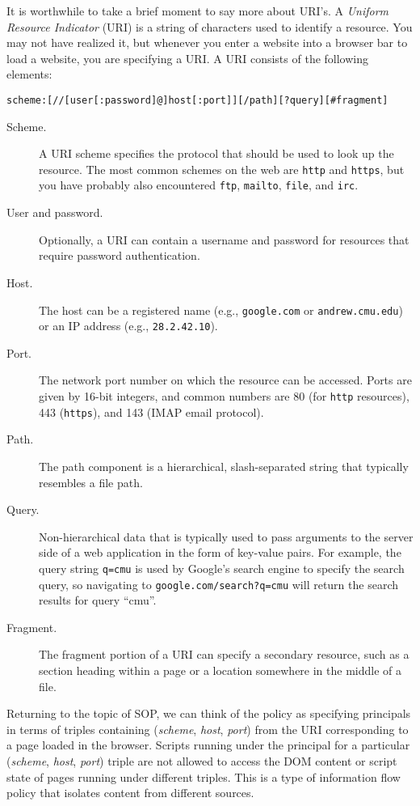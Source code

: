 \documentclass[11pt,twoside]{scrartcl}
\begin{document}
It is worthwhile to take a brief moment to say more about URI's. A \emph{Uniform Resource Indicator} (URI) is a string of characters used to identify a resource. You may not have realized it, but whenever you enter a website into a browser bar to load a website, you are specifying a URI. A URI consists of the following elements:
\begin{verbatim}
scheme:[//[user[:password]@]host[:port]][/path][?query][#fragment]
\end{verbatim}
\begin{description}
\item[Scheme.] A URI scheme specifies the protocol that should be used to look up the resource. The most common schemes on the web are \verb'http' and \verb'https', but you have probably also encountered \verb'ftp', \verb'mailto', \verb'file', and \verb'irc'.
\item[User and password.] Optionally, a URI can contain a username and password for resources that require password authentication.
\item[Host.] The host can be a registered name (e.g., \verb'google.com' or \verb'andrew.cmu.edu') or an IP address (e.g., \verb'28.2.42.10').
\item[Port.] The network port number on which the resource can be accessed. Ports are given by 16-bit integers, and common numbers are 80 (for \verb'http' resources), 443 (\verb'https'), and 143 (IMAP email protocol).
\item[Path.] The path component is a hierarchical, slash-separated string that typically resembles a file path.
\item[Query.] Non-hierarchical data that is typically used to pass arguments to the server side of a web application in the form of key-value pairs. For example, the query string \verb'q=cmu' is used by Google's search engine to specify the search query, so navigating to \verb'google.com/search?q=cmu' will return the search results for query ``cmu''.
\item[Fragment.] The fragment portion of a URI can specify a secondary resource, such as a section heading within a page or a location somewhere in the middle of a file.
\end{description}
Returning to the topic of SOP, we can think of the policy as specifying principals in terms of triples containing (\emph{scheme}, \emph{host}, \emph{port}) from the URI corresponding to a page loaded in the browser. Scripts running under the principal for a particular (\emph{scheme}, \emph{host}, \emph{port}) triple are not allowed to access the DOM content or script state of pages running under different triples. This is a type of information flow policy that isolates content from different sources.
\end{document}
